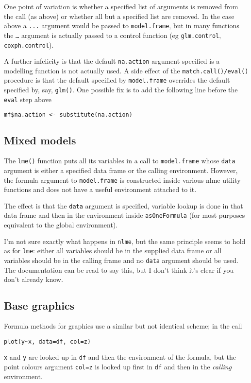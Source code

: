 \documentclass[11pt]{article}
\begin{document}
One point of variation is whether a specified list of arguments is removed from the call (as above) or whether all but a specified list are removed.  In the case above a \texttt{...} argument would be passed to \texttt{model.frame},  but in many 
functions the \texttt{\ldots} argument is actually passed to a control function (eg \texttt{glm.control}, \texttt{coxph.control}). 

A further infelicity is that the default \texttt{na.action} argument specified is a modelling function is not actually used.  A side effect of the \texttt{match.call()/eval()} procedure is that the default specified by \texttt{model.frame} overrides the default specified by, say, \texttt{glm()}.  One possible fix is to add the following line before the \texttt{eval} step above 
\begin{verbatim} 
mf$na.action <- substitute(na.action)
\end{verbatim} 


\subsection{Mixed models}
The \texttt{lme()} function puts all its variables in a call to \texttt{model.frame} whose \texttt{data} argument is either a specified data frame or the calling environment.  However, the formula argument to \texttt{model.frame} is constructed inside various nlme utility functions and does not have a useful environment attached to it. 

The effect is that the \texttt{data} argument is specified, variable lookup is done in that data frame and then in the environment inside \texttt{asOneFormula} (for most purposes equivalent to the global environment).
  
I'm not sure exactly what happens in \texttt{nlme}, but the same principle seems to hold as for \texttt{lme}: either all variables should be in the supplied data frame or all variables should be in the calling frame and no \texttt{data} argument should be used. The documentation can be read to say this, but I don't think it's clear if you don't already know.

\subsection{Base graphics}
Formula methods for graphics use a similar but not identical scheme; in the call
\begin{verbatim}
plot(y~x, data=df, col=z)
\end{verbatim}
\texttt{x} and \texttt{y} are looked up in \texttt{df} and then the environment of the formula,  but the point colours argument \texttt{col=z} is looked up first in \texttt{df} and then in the \emph{calling} environment.  
\end{document}
